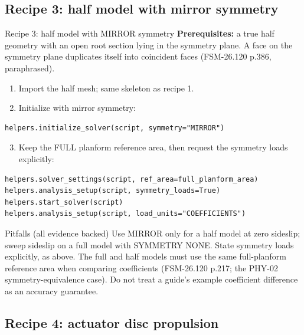 \documentclass[aspectratio=169,10pt]{beamer}
\begin{document}
\subsection{Recipe 3: half model with mirror symmetry}

\begin{frame}{Recipe 3: half model with MIRROR symmetry}
  \textbf{Prerequisites:} a true half geometry with an open root section lying in the symmetry plane. A face on the symmetry plane duplicates itself into coincident faces (FSM-26.120 p.386, paraphrased).
  \begin{enumerate}
    \item Import the half mesh; same skeleton as recipe 1.
    \item Initialize with mirror symmetry:
  \end{enumerate}
\begin{lstlisting}
helpers.initialize_solver(script, symmetry="MIRROR")
\end{lstlisting}
  \begin{enumerate}
    \setcounter{enumi}{2}
    \item Keep the FULL planform reference area, then request the symmetry loads explicitly:
  \end{enumerate}
\begin{lstlisting}
helpers.solver_settings(script, ref_area=full_planform_area)
helpers.analysis_setup(script, symmetry_loads=True)
helpers.start_solver(script)
helpers.analysis_setup(script, load_units="COEFFICIENTS")
\end{lstlisting}
  \begin{alertblock}{Pitfalls (all evidence backed)}
    Use MIRROR only for a half model at zero sideslip; sweep sideslip on a full model with SYMMETRY NONE. State symmetry loads explicitly, as above. The full and half models must use the same full-planform reference area when comparing coefficients (FSM-26.120 p.217; the PHY-02 symmetry-equivalence case). Do not treat a guide's example coefficient difference as an accuracy guarantee.
  \end{alertblock}
\end{frame}

\subsection{Recipe 4: actuator disc propulsion}
\end{document}
